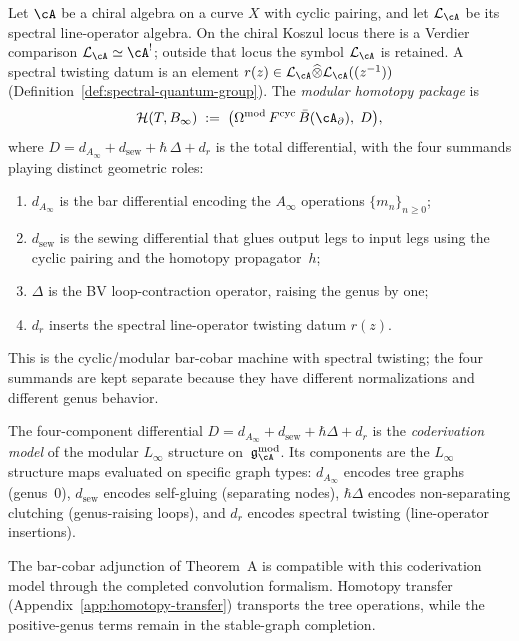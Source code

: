 \begin{definition}
\label{def:modular-homotopy-package}
Let $\cA$ be a chiral algebra on a curve $X$ with cyclic pairing, and
let $\mathcal L_\cA$ be its spectral line-operator algebra.  On the
chiral Koszul locus there is a Verdier comparison
$\mathcal L_\cA\simeq \cA^!$; outside that locus the symbol
$\mathcal L_\cA$ is retained.  A spectral twisting datum is an element
$r(z)\in
\mathcal L_\cA\widehat\otimes
\mathcal L_\cA((z^{-1}))$
(Definition~\ref{def:spectral-quantum-group}). The \emph{modular
homotopy package} is
\[
 \mathcal{H}(T, B_\infty)
 \;:=\;
 \bigl(\Omega^{\mathrm{mod}}\, F^{\mathrm{cyc}}\, \bar{B}(\cA_\partial),\;
 D\bigr),
\]
where $D = d_{A_\infty} + d_{\mathrm{sew}} + \hbar\,\Delta + d_r$ is
the total differential, with the four summands playing distinct
geometric roles:
\begin{enumerate}
\item $d_{A_\infty}$ is the bar differential encoding the $A_\infty$
 operations $\{m_n\}_{n \ge 0}$;
\item $d_{\mathrm{sew}}$ is the sewing differential that glues output
 legs to input legs using the cyclic pairing and the homotopy
 propagator~$h$;
\item $\Delta$ is the BV loop-contraction operator, raising the genus
 by one;
\item $d_r$ inserts the spectral line-operator twisting datum
 $r(z)$.
\end{enumerate}
This is the cyclic/modular bar-cobar machine with spectral twisting;
the four summands are kept separate because they have different
normalizations and different genus behavior.
\end{definition}

\begin{remark}
\label{rem:coderivation-linfty-model}
The four-component differential
$D = d_{A_\infty} + d_{\mathrm{sew}} + \hbar\Delta + d_r$
is the \emph{coderivation model} of the modular $L_\infty$ structure
on~$\mathfrak{g}_{\cA}^{\mathrm{mod}}$. Its components are the $L_\infty$ structure maps
evaluated on specific graph types: $d_{A_\infty}$ encodes tree graphs
(genus~$0$), $d_{\mathrm{sew}}$ encodes self-gluing (separating nodes),
$\hbar\Delta$ encodes non-separating clutching (genus-raising loops),
and $d_r$ encodes spectral twisting (line-operator insertions).

The bar-cobar adjunction of Theorem~A is compatible with this
coderivation model through the completed convolution formalism.
Homotopy transfer (Appendix~\ref{app:homotopy-transfer}) transports
the tree operations, while the positive-genus terms remain in the
stable-graph completion.
\end{remark}

